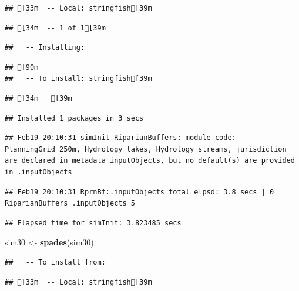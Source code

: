 \documentclass[
]{article}
\newenvironment{Shaded}{\begin{snugshade}}{\end{snugshade}}
\newcommand{\FunctionTok}[1]{\textcolor[rgb]{0.13,0.29,0.53}{\textbf{#1}}}
\newcommand{\NormalTok}[1]{#1}
\newcommand{\OtherTok}[1]{\textcolor[rgb]{0.56,0.35,0.01}{#1}}
\begin{document}
\begin{verbatim}
## [33m  -- Local: stringfish[39m
\end{verbatim}

\begin{verbatim}
## [34m  -- 1 of 1[39m
\end{verbatim}

\begin{verbatim}
##   -- Installing:
\end{verbatim}

\begin{verbatim}
## [90m
##   -- To install: stringfish[39m
\end{verbatim}

\begin{verbatim}
## [34m   [39m
\end{verbatim}

\begin{verbatim}
## Installed 1 packages in 3 secs
\end{verbatim}

\begin{verbatim}
## Feb19 20:10:31 simInit RiparianBuffers: module code: PlanningGrid_250m, Hydrology_lakes, Hydrology_streams, jurisdiction are declared in metadata inputObjects, but no default(s) are provided in .inputObjects
\end{verbatim}

\begin{verbatim}
## Feb19 20:10:31 RprnBf:.inputObjects total elpsd: 3.8 secs | 0 RiparianBuffers .inputObjects 5
\end{verbatim}

\begin{verbatim}
## Elapsed time for simInit: 3.823485 secs
\end{verbatim}

\begin{Shaded}
\begin{Highlighting}[]
\NormalTok{sim30 }\OtherTok{\textless{}{-}} \FunctionTok{spades}\NormalTok{(sim30)}
\end{Highlighting}
\end{Shaded}

\begin{verbatim}
##   -- To install from:
\end{verbatim}

\begin{verbatim}
## [33m  -- Local: stringfish[39m
\end{verbatim}
\end{document}
